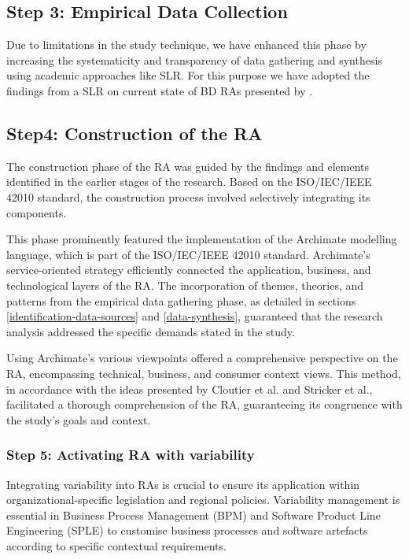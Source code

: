 \documentclass[journal]{IEEEtran}
\begin{document}
\subsection{Step 3: Empirical Data Collection} \label{theSLR}

Due to limitations in the study technique, we have enhanced this phase by increasing the systematicity and transparency of data gathering and synthesis using academic approaches like SLR. For this purpose we have adopted the findings from a SLR on current state of BD RAs presented by \cite{ataei2022state}.

\subsection{Step4: Construction of the RA}
The construction phase of the RA was guided by the findings and elements identified in the earlier stages of the research. Based on the ISO/IEC/IEEE 42010 standard, the construction process involved selectively integrating its components.

This phase prominently featured the implementation of the Archimate modelling language, which is part of the ISO/IEC/IEEE 42010 standard. Archimate's service-oriented strategy efficiently connected the application, business, and technological layers of the RA. The incorporation of themes, theories, and patterns from the empirical data gathering phase, as detailed in sections \ref{identification-data-sources} and \ref{data-synthesis}, guaranteed that the research analysis addressed the specific demands stated in the study.

Using Archimate's various viewpoints offered a comprehensive perspective on the RA, encompassing technical, business, and consumer context views. This method, in accordance with the ideas presented by Cloutier et al. and Stricker et al., facilitated a thorough comprehension of the RA, guaranteeing its congruence with the study's goals and context.


\subsubsection{Step 5: Activating RA with variability}

Integrating variability into RAs is crucial to ensure its application within organizational-specific legislation and regional policies. Variability management is essential in Business Process Management (BPM) and Software Product Line Engineering (SPLE) to customise business processes and software artefacts according to specific contextual requirements.
\end{document}
